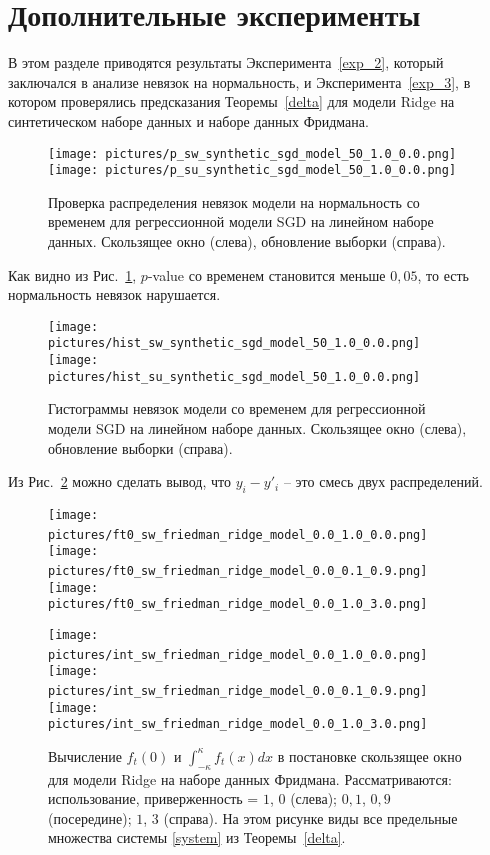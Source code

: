 \section{Дополнительные эксперименты} \label{Appendix}

    В этом разделе приводятся результаты Эксперимента~\ref{exp_2}, который заключался в анализе невязок на нормальность, и Эксперимента~\ref{exp_3}, в котором проверялись предсказания Теоремы~\ref{delta} для модели Ridge на синтетическом наборе данных и наборе данных Фридмана.

    \begin{figure}[ht]
        \centering
        \texttt{[image: pictures/p\_sw\_synthetic\_sgd\_model\_50\_1.0\_0.0.png]}
        \texttt{[image: pictures/p\_su\_synthetic\_sgd\_model\_50\_1.0\_0.0.png]}
        
        \caption{Проверка распределения невязок модели на нормальность со временем для регрессионной модели SGD на линейном наборе данных. Скользящее окно (слева), обновление выборки (справа).}
        \label{p_value}
    \end{figure}

    Как видно из Рис.~\ref{p_value}, $p$-value со временем становится меньше $0,05$, то есть нормальность невязок нарушается.

    \begin{figure}[ht]
        \centering
        \texttt{[image: pictures/hist\_sw\_synthetic\_sgd\_model\_50\_1.0\_0.0.png]}
        \texttt{[image: pictures/hist\_su\_synthetic\_sgd\_model\_50\_1.0\_0.0.png]}
        
        \caption{Гистограммы невязок модели со временем для регрессионной модели SGD на линейном наборе данных. Скользящее окно (слева), обновление выборки (справа).}
        \label{hist}
    \end{figure}

    Из Рис.~\ref{hist} можно сделать вывод, что $y_i - y'_i$ -- это смесь двух распределений.

    \begin{figure}
        \centering
        \texttt{[image: pictures/ft0\_sw\_friedman\_ridge\_model\_0.0\_1.0\_0.0.png]}~
        \texttt{[image: pictures/ft0\_sw\_friedman\_ridge\_model\_0.0\_0.1\_0.9.png]}~
        \texttt{[image: pictures/ft0\_sw\_friedman\_ridge\_model\_0.0\_1.0\_3.0.png]}
    
        \texttt{[image: pictures/int\_sw\_friedman\_ridge\_model\_0.0\_1.0\_0.0.png]}~
        \texttt{[image: pictures/int\_sw\_friedman\_ridge\_model\_0.0\_0.1\_0.9.png]}~
        \texttt{[image: pictures/int\_sw\_friedman\_ridge\_model\_0.0\_1.0\_3.0.png]}
        
        \caption{Вычисление $f_t(0)$ и $\int_{-\kappa}^{\kappa}f_t(x)dx$ в постановке скользящее окно для модели Ridge на наборе данных Фридмана. Рассматриваются: использование, приверженность = $1$, $0$ (слева); $0,1$, $0,9$ (посередине); $1$, $3$ (справа). На этом рисунке виды все предельные множества системы \eqref{system} из Теоремы~\ref{delta}.}
        \label{delta_loop_1}
    \end{figure}

